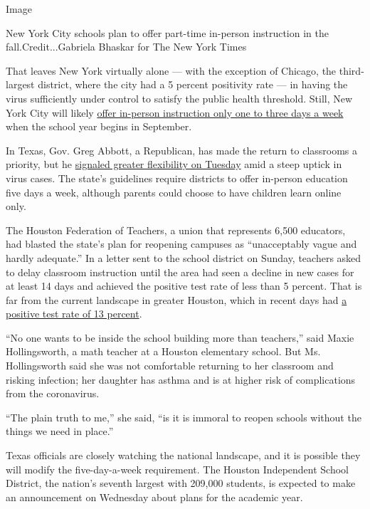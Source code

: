 Image

New York City schools plan to offer part-time in-person instruction in
the fall.Credit...Gabriela Bhaskar for The New York Times

That leaves New York virtually alone --- with the exception of Chicago,
the third-largest district, where the city had a 5 percent positivity
rate --- in having the virus sufficiently under control to satisfy the
public health threshold. Still, New York City will likely
\href{https://www.nytimes3xbfgragh.onion/2020/07/08/nyregion/nyc-schools-reopening-plan.html}{offer
in-person instruction only one to three days a week} when the school
year begins in September.

In Texas, Gov. Greg Abbott, a Republican, has made the return to
classrooms a priority, but he
\href{https://www.texastribune.org/2020/07/14/texas-schools-online-pandemic/}{signaled
greater flexibility on Tuesday} amid a steep uptick in virus cases. The
state's guidelines require districts to offer in-person education five
days a week, although parents could choose to have children learn online
only.

The Houston Federation of Teachers, a union that represents 6,500
educators, had blasted the state's plan for reopening campuses as
``unacceptably vague and hardly adequate.'' In a letter sent to the
school district on Sunday, teachers asked to delay classroom instruction
until the area had seen a decline in new cases for at least 14 days and
achieved the positive test rate of less than 5 percent. That is far from
the current landscape in greater Houston, which in recent days had
\href{https://www.tmc.edu/coronavirus-updates/covid-19-testing-trends/}{a
positive test rate of 13 percent}.

``No one wants to be inside the school building more than teachers,''
said Maxie Hollingsworth, a math teacher at a Houston elementary school.
But Ms. Hollingsworth said she was not comfortable returning to her
classroom and risking infection; her daughter has asthma and is at
higher risk of complications from the coronavirus.

``The plain truth to me,'' she said, ``is it is immoral to reopen
schools without the things we need in place.''

Texas officials are closely watching the national landscape, and it is
possible they will modify the five-day-a-week requirement. The Houston
Independent School District, the nation's seventh largest with 209,000
students, is expected to make an announcement on Wednesday about plans
for the academic year.

